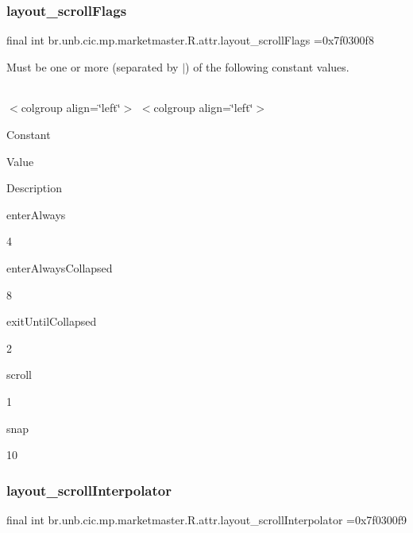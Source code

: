 \subsubsection{\texorpdfstring{layout\+\_\+scroll\+Flags}{layout\_scrollFlags}}
{\footnotesize\ttfamily final int br.\+unb.\+cic.\+mp.\+marketmaster.\+R.\+attr.\+layout\+\_\+scroll\+Flags =0x7f0300f8\hspace{0.3cm}{\ttfamily [static]}}

Must be one or more (separated by \textquotesingle{}$\vert$\textquotesingle{}) of the following constant values.

\tabulinesep=1mm
\begin{longtabu} spread 0pt [c]{*{0}{|X[-1]}|}
\hline
\end{longtabu}
$<$colgroup align=\char`\"{}left\char`\"{}$>$ $<$colgroup align=\char`\"{}left\char`\"{}$>$ 

Constant

Value

Description 

enter\+Always

4

enter\+Always\+Collapsed

8

exit\+Until\+Collapsed

2

scroll

1

snap

10\mbox{\label{classbr_1_1unb_1_1cic_1_1mp_1_1marketmaster_1_1R_1_1attr_a363309f45ccbe1bf76d1d1b387c66829}} 
\subsubsection{\texorpdfstring{layout\+\_\+scroll\+Interpolator}{layout\_scrollInterpolator}}
{\footnotesize\ttfamily final int br.\+unb.\+cic.\+mp.\+marketmaster.\+R.\+attr.\+layout\+\_\+scroll\+Interpolator =0x7f0300f9\hspace{0.3cm}{\ttfamily [static]}}

